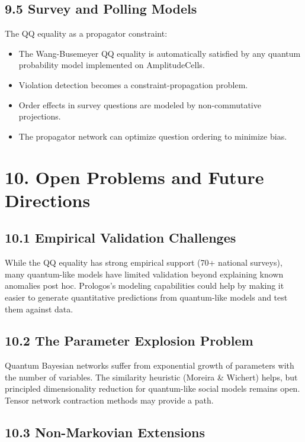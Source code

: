 \documentclass[11pt]{article}
\begin{document}
\subsection{9.5 Survey and Polling Models}
\label{sec:orgae29d8b}

The QQ equality as a propagator constraint:

\begin{itemize}
\item The Wang-Busemeyer QQ equality is automatically satisfied by any quantum
probability model implemented on AmplitudeCells.
\item Violation detection becomes a constraint-propagation problem.
\item Order effects in survey questions are modeled by non-commutative projections.
\item The propagator network can optimize question ordering to minimize bias.
\end{itemize}
\section{10. Open Problems and Future Directions}
\label{sec:org76bf475}

\subsection{10.1 Empirical Validation Challenges}
\label{sec:orga074828}

While the QQ equality has strong empirical support (70+ national surveys), many
quantum-like models have limited validation beyond explaining known anomalies post
hoc. Prologos's modeling capabilities could help by making it easier to generate
quantitative predictions from quantum-like models and test them against data.
\subsection{10.2 The Parameter Explosion Problem}
\label{sec:org86cc8fc}

Quantum Bayesian networks suffer from exponential growth of parameters with the
number of variables. The similarity heuristic (Moreira \& Wichert) helps, but
principled dimensionality reduction for quantum-like social models remains open.
Tensor network contraction methods may provide a path.
\subsection{10.3 Non-Markovian Extensions}
\label{sec:orgde5e3aa}
\end{document}
